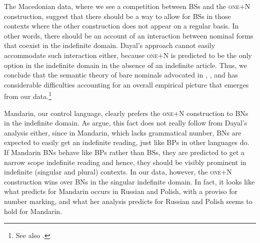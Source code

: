 \documentclass[output=paper,colorlinks,citecolor=brown]{langscibook}
\begin{document}
The Macedonian data, where we see a competition between BSs and the \textsc{one}$+$N construction, suggest that there should be a way to allow for BSs in those contexts where the other construction does not appear on a regular basis. In other words, there should be an account of an interaction between nominal forms that coexist in the indefinite domain. Dayal's approach cannot easily accommodate such interaction either, because \textsc{one}$+$N is predicted to be the only option in the indefinite domain in the absence of an indefinite article.  Thus, we conclude that the semantic theory of bare nominals advocated in \citet{Dayal2004}, \citet{Dayal2018}, and \citet{DayalSag2020} has considerable difficulties accounting for an overall empirical picture that emerges from our data.\footnote{See also \citet{Liuetal2022}.} 

Mandarin, our control language, clearly prefers the \textsc{one}$+$N construction to BNs in the indefinite domain. As \citet{Liuetal2022} argue, this fact does not really follow from Dayal's analysis either, since in Mandarin, which lacks grammatical number, BNs are expected to easily get an indefinite reading, just like BPs in other languages do. If Mandarin BNs behave like BPs rather than BSs, they are predicted to get a narrow scope indefinite reading and hence, they should be visibly prominent in indefinite (singular and plural) contexts. In our data, however, the \textsc{one}$+$N construction wins over BNs in the singular indefinite domain. In fact, it looks like what \citet{Dayal2004, Dayal2018} predicts for Mandarin occurs in Russian and Polish, with a proviso for number marking, and what her analysis predicts for Russian and Polish seems to hold for Mandarin.
\end{document}
